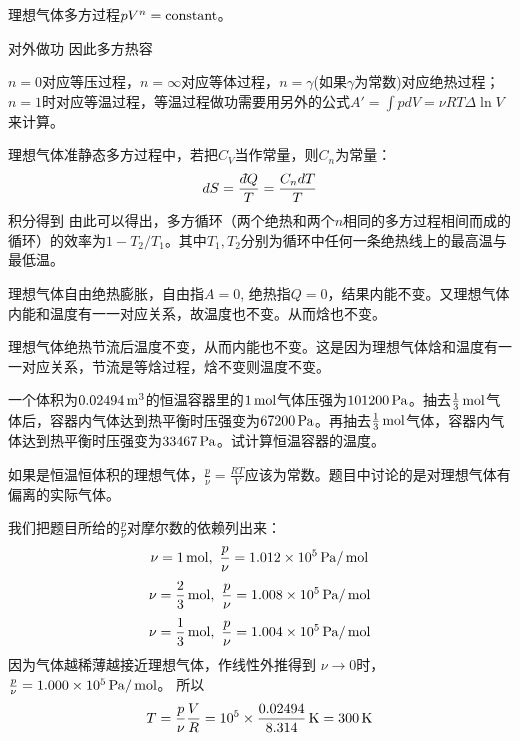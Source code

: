 \documentclass[CJK]{beamer}
\begin{document}
\begin{frame}
  \bch
  理想气体多方过程$pV^n = \mathrm{constant}$。

  对外做功
  因此多方热容

  $n=0$对应等压过程，$n=\infty$对应等体过程，$n=\gamma$(如果$\gamma$为常数)对应绝热过程；$n=1$时对应等温过程，等温过程做功需要用另外的公式$A' = \int pdV = \nu R T\Delta \ln V$来计算。


  \ech
\end{frame}


\begin{frame}
  \bch
  理想气体准静态多方过程中，若把$C_V$当作常量，则$C_n$为常量：
  $$dS = \frac{\dbar Q}{T} = \frac{C_n dT}{T}$$
  积分得到
由此可以得出，多方循环（两个绝热和两个$n$相同的多方过程相间而成的循环）的效率为$1-T_2/T_1$。其中$T_1, T_2$分别为循环中任何一条绝热线上的最高温与最低温。
  \ech
\end{frame}

\begin{frame}
  \bch
  \bitem
\item{理想气体自由绝热膨胀，自由指$A=0$, 绝热指$Q=0$，结果内能不变。又理想气体内能和温度有一一对应关系，故温度也不变。从而焓也不变。}
\item{理想气体绝热节流后温度不变，从而内能也不变。这是因为理想气体焓和温度有一一对应关系，节流是等焓过程，焓不变则温度不变。}
  \eitem
  \ech
\end{frame}

\begin{frame}
  \chtitle{\proid (\stwo)}
  \bch
一个体积为$0.02494\,\mathrm{m}^3$的恒温容器里的$1\,\mathrm{mol}$气体压强为$101200 \,\mathrm{Pa}$。抽去$\frac{1}{3}\,\mathrm{mol}$气体后，容器内气体达到热平衡时压强变为$67200\,\mathrm{Pa}$。再抽去$\frac{1}{3}\,\mathrm{mol}$气体，容器内气体达到热平衡时压强变为$33467\,\mathrm{Pa}$。试计算恒温容器的温度。 
  \ech
\end{frame}

\begin{frame}
  \bch
  如果是恒温恒体积的理想气体，$\frac{p}{\nu} = \frac{RT}{V}$应该为常数。题目中讨论的是对理想气体有偏离的实际气体。
  
  我们把题目所给的$\frac{p}{\nu}$对摩尔数的依赖列出来：
  $$ \nu = 1\,\mathrm{mol},\ \frac{p}{\nu } = 1.012\times 10^5 \,\mathrm{Pa}/\,\mathrm{mol}$$
  $$ \nu = \frac{2}{3}\,\mathrm{mol},\ \frac{p}{\nu } = 1.008\times 10^5 \,\mathrm{Pa}/\,\mathrm{mol} $$
  $$ \nu = \frac{1}{3}\,\mathrm{mol},\ \frac{p}{\nu } = 1.004\times 10^5 \,\mathrm{Pa}/\,\mathrm{mol}$$
  因为气体越稀薄越接近理想气体，作线性外推得到
  $ \nu \rightarrow 0$时，  $\frac{p}{\nu} = 1.000\times 10^5\,\mathrm{Pa}/\,\mathrm{mol}$。
  所以
  $$ T = \frac{p}{\nu} \frac{V}{R} = 10^5\times \frac{0.02494}{8.314} \,\mathrm{K} = 300\,\mathrm{K}$$
  
  \ech
\end{frame}
\end{document}
